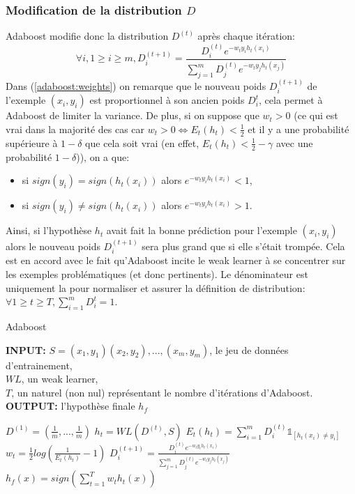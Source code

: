 \documentclass[french]{article}
\theoremstyle{definition}
\theoremstyle{remark}
\begin{document}
\subsubsection{Modification de la distribution $D$}
\label{adaboost:newdistrib}
Adaboost modifie donc la distribution $D^{(t)}$ après chaque itération: 
\begin{equation}
\label{adaboost:weights}
\forall i, 1 \geq i \geq m, D^{(t+1)}_i = \frac{D^{(t)}_i e^{-w_t y_i h_t(x_i)}}{\sum_{j=1}^m D^{(t)}_j e^{-w_t y_j h_t(x_j)}} 
\end{equation}   
Dans (\ref{adaboost:weights}) on remarque que le nouveau poids $D^{(t+1)}_i$ de l'exemple $(x_i,y_i)$ est proportionnel à son ancien poids $D^{t}_i$, cela permet à Adaboost de limiter la variance. De plus, si on suppose que $w_t > 0$ (ce qui est vrai dans la majorité des cas car $w_t > 0 \Leftrightarrow E_t(h_t) < \frac{1}{2}$ et il y a une probabilité supérieure à $1-\delta$ que cela soit vrai (en effet, $E_t(h_t) < \frac{1}{2} - \gamma$ avec une probabilité $1-\delta$)), on a que:
\begin{itemize}
\item si $sign(y_i)=sign(h_t(x_i))$ alors $e^{-w_t y_i h_t(x_i)} < 1$,
\item si $sign(y_i) \neq sign(h_t(x_i))$ alors $e^{-w_t y_i h_t(x_i)} > 1$. 
\end{itemize}
Ainsi, si l'hypothèse $h_t$ avait fait la bonne prédiction pour l'exemple $(x_i,y_i)$ alors le nouveau poids $D^{(t+1)}_i$ sera plus grand que si elle s'était trompée. Cela est en accord avec le fait qu'Adaboost incite le weak learner à se concentrer sur les exemples problématiques (et donc pertinents).
Le dénominateur est uniquement la pour normaliser et assurer la définition de distribution: $\forall 1 \geq t \geq T, \sum_{i=1}^m D^t_i = 1$.


\begin{algorithm}[H]
\caption{Adaboost}
\label{adaboost:algo}
\begin{flushleft}
        \textbf{INPUT:} $S=(x_1,y_1)(x_2,y_2),...,(x_m,y_m)$, le jeu de données d'entrainement,\\
        				\hspace{1.5cm} $WL$, un weak learner,\\
        				\hspace{1.5cm} $T$, un naturel (non nul) représentant le nombre d'itérations d'Adaboost.\\
        \textbf{OUTPUT:} l'hypothèse finale $h_f$
\end{flushleft}
\begin{algorithmic}[1]
\State $D^{(1)}=(\frac{1}{m},...,\frac{1}{m})$
\State $h_t = WL(D^{(t)},S)$
\State $E_t(h_t)= \sum_{i=1}^m D^{(t)}_i \mathbb{1}_{[h_t(x_i) \neq y_i]}$
\State $w_t = \frac{1}{2} log(\frac{1}{E_t(h_t)} - 1)$
\State $D^{(t+1)}_i = \frac{D^{(t)}_i e^{-w_t y_i h_t(x_i)}}{\sum_{j=1}^m D^{(t)}_j e^{-w_t y_j h_t(x_j)}}$ 
\EndFor
\EndFor
\State $h_f(x) = sign (\sum_{t=1}^T w_t h_t(x))$
\State {}
\EndFunction
\end{algorithmic}
\end{algorithm}
\end{document}

